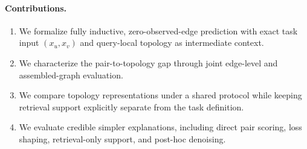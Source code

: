 \paragraph{Contributions.}
\begin{enumerate}
    \item We formalize fully inductive, zero-observed-edge prediction with exact
    task input $(x_u,x_v)$ and query-local topology as intermediate context.
    \item We characterize the pair-to-topology gap through joint edge-level and
    assembled-graph evaluation.
    \item We compare topology representations under a shared protocol while
    keeping retrieval support explicitly separate from the task definition.
    \item We evaluate credible simpler explanations, including direct pair
    scoring, loss shaping, retrieval-only support, and post-hoc denoising.
\end{enumerate}

